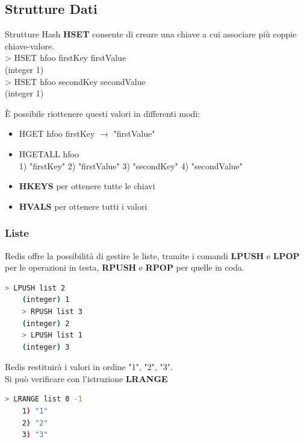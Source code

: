 \documentclass[xcolor=dvipsnames]{beamer}
\begin{document}
      \subsection{Strutture Dati}
        \begin{frame}{Strutture Hash}
          \textbf{HSET} consente di creare una chiave a cui associare più coppie chiave-valore. \\
          > HSET hfoo firstKey firstValue \\
          (integer 1)\\
          > HSET hfoo secondKey secondValue\\
          (integer 1)

          \bigskip

          È possibile riottenere questi valori in differenti modi:
          \begin{itemize}
            \item HGET hfoo firstKey $\rightarrow$ "firstValue"
            \item HGETALL hfoo \\
                  1) "firstKey"
                  2) "firstValue"
                  3) "secondKey"
                  4) "secondValue"
            \item \textbf{HKEYS} per ottenere tutte le chiavi
            \item \textbf{HVALS} per ottenere tutti i valori
          \end{itemize}

        \end{frame}

\begin{frame}[fragile]
  \frametitle{Liste}
  Redis offre la possibilità di gestire le liste, tramite i comandi \textbf{LPUSH} e \textbf{LPOP} per le operazioni in testa,
  \textbf{RPUSH} e \textbf{RPOP} per quelle in coda.
  \\
  \begin{lstlisting}[language=bash]
    > LPUSH list 2
    (integer) 1
    > RPUSH list 3
    (integer) 2
    > LPUSH list 1
    (integer) 3
  \end{lstlisting}

  Redis restituirà i valori in ordine "1", "2", "3". \\
  Si può verificare con l'istruzione \textbf{LRANGE}
  \\

  \begin{lstlisting}[language=bash]
    > LRANGE list 0 -1
    1) "1"
    2) "2"
    3) "3"
  \end{lstlisting}

\end{frame}
\end{document}
